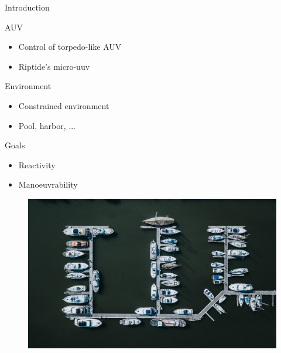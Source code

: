 \documentclass[10pt, xcolor={usenames, dvipsnames}]{beamer}
\begin{document}
        \begin{frame}{Introduction}
            \begin{minipage}[t]{0.55\textwidth}
                \begin{block}{AUV}
                    \vspace{0.25cm}
                    \begin{itemize}
                        \item Control of torpedo-like AUV \\ 
                        \item Riptide's micro-uuv
                    \end{itemize}
                \end{block}
                \begin{block}{Environment}
                    \begin{itemize}
                        \item Constrained environment \\ 
                        \item Pool, harbor, ...
                    \end{itemize}
                \end{block}
                \begin{block}{Goals}
                    \begin{itemize}
                        \item Reactivity \\
                        \item Manoeuvrability
                    \end{itemize}
                \end{block}
            \end{minipage}
            \hfill
            \begin{minipage}[t]{0.4\textwidth}
                \begin{figure}[htb]
                    \includegraphics[width=\textwidth]{imgs/harbour.png}


\end{figure}
\end{minipage}
\end{frame}
\end{document}

